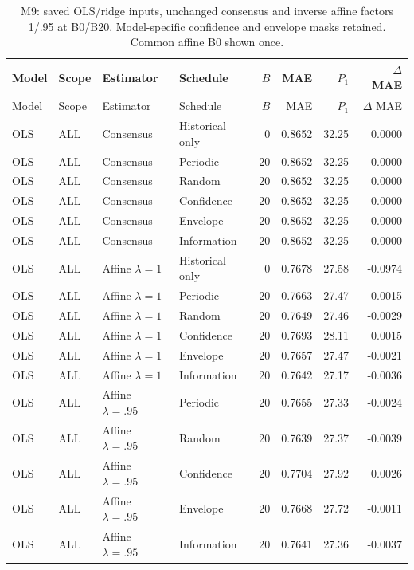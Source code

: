 \small\setlength{\tabcolsep}{4pt}
\begin{longtable}{llllrrrr}
\caption{M9: saved OLS/ridge inputs, unchanged consensus and inverse affine factors 1/.95 at B0/B20. Model-specific confidence and envelope masks retained. Common affine B0 shown once.}\label{tab:s_models}\\
\toprule
Model & Scope & Estimator & Schedule & $B$ & MAE & $P_1$ & $\Delta$ MAE \\ \midrule\endfirsthead
\toprule
Model & Scope & Estimator & Schedule & $B$ & MAE & $P_1$ & $\Delta$ MAE \\ \midrule\endhead
\bottomrule\endfoot
OLS & ALL & Consensus & Historical only & 0 & 0.8652 & 32.25 & 0.0000 \\
OLS & ALL & Consensus & Periodic & 20 & 0.8652 & 32.25 & 0.0000 \\
OLS & ALL & Consensus & Random & 20 & 0.8652 & 32.25 & 0.0000 \\
OLS & ALL & Consensus & Confidence & 20 & 0.8652 & 32.25 & 0.0000 \\
OLS & ALL & Consensus & Envelope & 20 & 0.8652 & 32.25 & 0.0000 \\
OLS & ALL & Consensus & Information & 20 & 0.8652 & 32.25 & 0.0000 \\
OLS & ALL & Affine $\lambda=1$ & Historical only & 0 & 0.7678 & 27.58 & -0.0974 \\
OLS & ALL & Affine $\lambda=1$ & Periodic & 20 & 0.7663 & 27.47 & -0.0015 \\
OLS & ALL & Affine $\lambda=1$ & Random & 20 & 0.7649 & 27.46 & -0.0029 \\
OLS & ALL & Affine $\lambda=1$ & Confidence & 20 & 0.7693 & 28.11 & 0.0015 \\
OLS & ALL & Affine $\lambda=1$ & Envelope & 20 & 0.7657 & 27.47 & -0.0021 \\
OLS & ALL & Affine $\lambda=1$ & Information & 20 & 0.7642 & 27.17 & -0.0036 \\
OLS & ALL & Affine $\lambda=.95$ & Periodic & 20 & 0.7655 & 27.33 & -0.0024 \\
OLS & ALL & Affine $\lambda=.95$ & Random & 20 & 0.7639 & 27.37 & -0.0039 \\
OLS & ALL & Affine $\lambda=.95$ & Confidence & 20 & 0.7704 & 27.92 & 0.0026 \\
OLS & ALL & Affine $\lambda=.95$ & Envelope & 20 & 0.7668 & 27.72 & -0.0011 \\
OLS & ALL & Affine $\lambda=.95$ & Information & 20 & 0.7641 & 27.36 & -0.0037 \\

\end{longtable}
